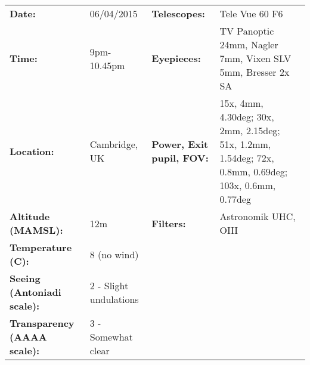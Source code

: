 \begin{tabular}{ p{1.7in} p{1.2in} p{1.5in} p{4.2in}}
{\bf Date:} & 06/04/2015 & {\bf Telescopes:} & Tele Vue 60 F6 \\ 
{\bf Time:} & 9pm-10.45pm & {\bf Eyepieces:} & TV Panoptic 24mm, Nagler 7mm, Vixen SLV 5mm, Bresser 2x SA \\ 
{\bf Location:} & Cambridge, UK & {\bf Power, Exit pupil, FOV:} & 15x, 4mm, 4.30deg; 30x, 2mm, 2.15deg; 51x, 1.2mm, 1.54deg; 72x, 0.8mm, 0.69deg; 103x, 0.6mm, 0.77deg \\ 
{\bf Altitude (MAMSL):} & 12m & {\bf Filters:} & Astronomik UHC, OIII \\ 
{\bf Temperature (C):} & 8 (no wind) & & \\ 
{\bf Seeing (Antoniadi scale):} & 2 - Slight undulations & & \\ 
{\bf Transparency (AAAA scale):} & 3 - Somewhat clear & & \\ 
\end{tabular}
\centering 

